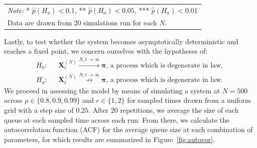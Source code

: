 \begin{table}
\begin{tabular}{|c|c|c|c|}
    \end{tabular}

    \begin{tabular}{p{10cm}}
        \textit{Note:} * $\hat{p}(H_{a}) < 0.1$, ** $\hat{p}(H_{a}) < 0.05$, *** $\hat{p}(H_{a}) < 0.01$
        \\
        Data are drawn from 20 simulations run for each $N$.
    \end{tabular}
\end{table}

Lastly, to test whether the system becomes asymptotically deterministic and reaches a fixed point, we concern ourselves with the hypotheses of:
\begin{align*}
    \label{chi 1}
    H_{0} :& \text{ }\mathbf{X}^{(N)}_{t} \overset{N,t \rightarrow \infty}{\rightarrow} \boldsymbol{\pi} \text{, a process which is degenerate in law,}  \\
    H_{a} :& \text{ }\mathbf{X}^{(N)}_{t} \overset{N,t \rightarrow \infty}{\not \rightarrow} \boldsymbol{\pi} \text{, a process which is degenerate in law.}
\end{align*}
We proceed in assessing the model by means of simulating a system at $N=500$ across $\rho \in \{0.8, 0.9 ,0.99\}$ and $r \in \{1,2\}$ for sampled times drawn from a uniform grid with a step size of $0.25$.
After $20$ repetitions, we average the size of each queue at each sampled time across each run.
From there, we calculate the autocorrelation function (ACF) for the average queue size at each combination of parameters, for which results are summarized in Figure~\ref{fig:autocor}.

